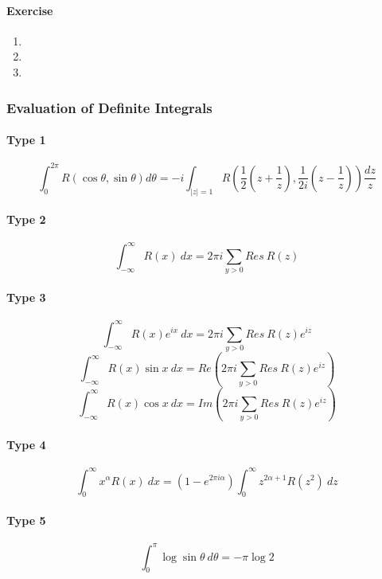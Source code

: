 \paragraph{Exercise}
\begin{enumerate}
	\item
	\item
	\item
\end{enumerate}
\subsubsection{Evaluation of Definite Integrals}
\paragraph{Type 1}
\begin{equation}
	\int_0^{2\pi} R(\cos \theta,\sin \theta) d\theta = -i\int_{|z|=1} \!\!\! R\left(\frac{1}{2}(z+\frac{1}{z}),\frac{1}{2i}(z-\frac{1}{z}) \right) \frac{dz}{z}
\end{equation}

\paragraph{Type 2}
\begin{equation}
	\int_{-\infty}^\infty R(x)\ dx = 2\pi i \sum_{y>0} Res\ R(z)
\end{equation}

\paragraph{Type 3}
\begin{equation}
	\int_{-\infty}^\infty R(x)e^{ix}\ dx = 2\pi i \sum_{y > 0} Res\ R(z)e^{iz}
\end{equation}
\begin{equation}
	\int_{-\infty}^\infty R(x) \sin x\ dx = Re \left( 2\pi i \sum_{y > 0} Res\ R(z)e^{iz} \right)
\end{equation}
\begin{equation}
	\int_{-\infty}^\infty R(x) \cos x\ dx = Im \left( 2\pi i \sum_{y > 0} Res\ R(z)e^{iz} \right)
\end{equation}

\paragraph{Type 4}
\begin{equation}
	\int_0^\infty x^\alpha R(x)\ dx	= (1-e^{2\pi i \alpha})\int_0^\infty z^{2\alpha+1} R(z^2)\ dz
\end{equation}

\paragraph{Type 5}
\begin{equation}
	\int_0^\pi \log \sin \theta\ d\theta = -\pi \log 2
\end{equation}
